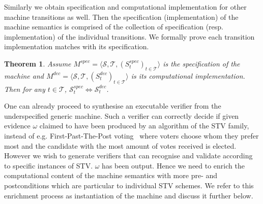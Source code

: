 \documentclass[10pt,conference]{IEEEtran}
\newtheorem{theorem}{Theorem}
\begin{document}
Similarly  
we obtain specification and computational implementation for other machine transitions as well. Then the specification (implementation) of the machine semantics is comprised of the collection of specification (resp. implementation) of the individual transitions. We formally prove 
each transition implementation  matches with its specification.
\begin{theorem}
Assume $M^{spec} = \langle \mathcal{S}, \mathcal{T}, (S_{t}^{spec})_{t \in \mathcal{T}} \rangle$ is the specification of the machine and  $M^{dec} = \langle \mathcal{S}, \mathcal{T}, (S_{t}^{dec})_{t \in \mathcal{T}} \rangle$ is its computational implementation. Then for any $t\in\mathcal{T}$,  $\mathcal{S}_{t}^{spec}\Leftrightarrow\mathcal{S}_{t}^{dec}$.      
\end{theorem}

One can already proceed to synthesise an executable verifier from
the underspecified generic machine. Such a verifier can correctly decide if given evidence
$\omega$ claimed to have been produced by an algorithm of the STV
family,  instead of e.g. First-Past-The-Post
voting~\cite{DFar} where voters choose whom they prefer most and the
candidate with the most amount of votes received is elected.
However we wish to generate verifiers that can recognise and
validate according to specific instances of STV. 
$\omega$ has been output. Hence we need to enrich the computational
content of the machine semantics with more  pre- and postconditions
which are particular to individual STV schemes. We refer to this
enrichment process as instantiation of the machine and discuss it
further below.
\end{document}
